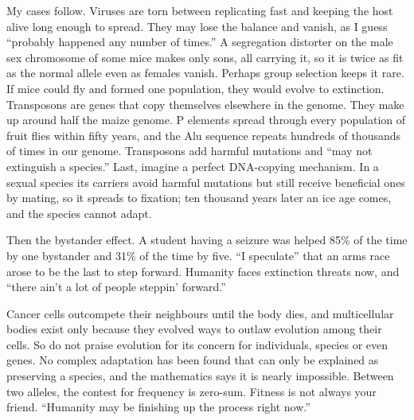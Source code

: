 My cases follow. Viruses are torn between replicating fast and keeping the host alive long enough to spread. They may lose the balance and vanish, as I guess ``probably happened any number of times.'' A segregation distorter on the male sex chromosome of some mice makes only sons, all carrying it, so it is twice as fit as the normal allele even as females vanish. Perhaps group selection keeps it rare. If mice could fly and formed one population, they would evolve to extinction. Transposons are genes that copy themselves elsewhere in the genome. They make up around half the maize genome. P elements spread through every population of fruit flies within fifty years, and the Alu sequence repeats hundreds of thousands of times in our genome. Transposons add harmful mutations and ``may not extinguish a species.'' Last, imagine a perfect DNA-copying mechanism. In a sexual species its carriers avoid harmful mutations but still receive beneficial ones by mating, so it spreads to fixation; ten thousand years later an ice age comes, and the species cannot adapt. 

Then the bystander effect. A student having a seizure was helped 85\% of the time by one bystander and 31\% of the time by five. ``I speculate'' that an arms race arose to be the last to step forward. Humanity faces extinction threats now, and ``there ain't a lot of people steppin' forward.'' 

Cancer cells outcompete their neighbours until the body dies, and multicellular bodies exist only because they evolved ways to outlaw evolution among their cells. So do not praise evolution for its concern for individuals, species or even genes. No complex adaptation has been found that can only be explained as preserving a species, and the mathematics says it is nearly impossible. Between two alleles, the contest for frequency is zero-sum. Fitness is not always your friend. ``Humanity may be finishing up the process right now.'' 
